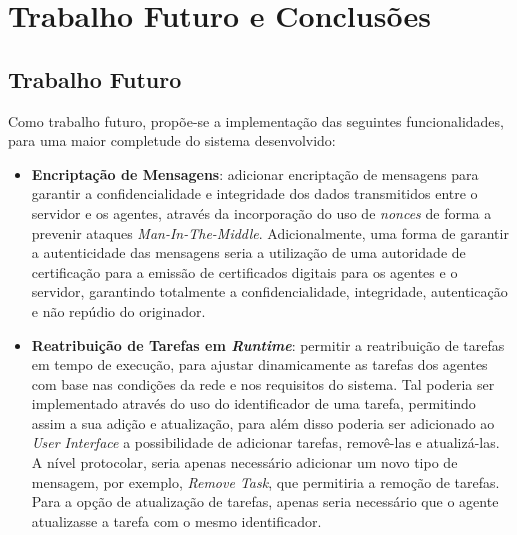 \documentclass[a4paper,12pt]{scrreprt}
\begin{document}


\chapter{Trabalho Futuro e Conclusões}

\section{Trabalho Futuro}

Como trabalho futuro, propõe-se a implementação das seguintes funcionalidades,
para uma maior completude do sistema desenvolvido:

\begin{itemize}
    \item \textbf{Encriptação de Mensagens}: adicionar encriptação de
    mensagens para garantir a confidencialidade e integridade dos dados transmitidos entre
    o servidor e os agentes, através da incorporação do uso de \textit{nonces}
    de forma a prevenir ataques \textit{Man-In-The-Middle}. Adicionalmente, uma forma de
    garantir a autenticidade das mensagens seria a utilização de uma autoridade de certificação
    para a emissão de certificados digitais para os agentes e o servidor, garantindo totalmente
    a confidencialidade, integridade, autenticação e não repúdio do originador.

    \item \textbf{Reatribuição de Tarefas em \textit{Runtime}}: permitir a reatribuição
    de tarefas em tempo de execução, para ajustar dinamicamente as tarefas dos agentes
    com base nas condições da rede e nos requisitos do sistema. Tal poderia ser implementado
    através do uso do identificador de uma tarefa, permitindo assim a sua adição e atualização,
    para além disso poderia ser adicionado ao \textit{User Interface} a possibilidade de
    adicionar tarefas, removê-las e atualizá-las. A nível protocolar, seria apenas necessário
    adicionar um novo tipo de mensagem, por exemplo, \textit{Remove Task}, que permitiria
    a remoção de tarefas. Para a opção de atualização de tarefas, apenas seria necessário
    que o agente atualizasse a tarefa com o mesmo identificador.
\end{itemize}
\end{document}
